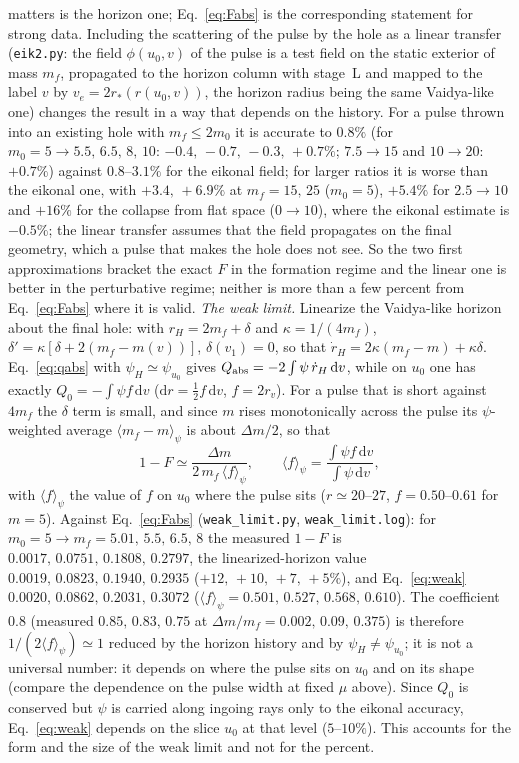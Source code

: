 \documentclass[11pt]{article}
\begin{document}
matters is the horizon one; Eq.~\eqref{eq:Fabs} is the corresponding statement for strong data. Including the scattering of the pulse by the hole as a linear transfer (\texttt{eik2.py}: the field $\phi(u_0,v)$ of the pulse is a test field on the static exterior of mass $m_f$, propagated to the horizon column with stage~L and mapped to the label $v$ by $v_e=2r_*(r(u_0,v))$, the horizon radius being the same Vaidya-like one) changes the result in a way that depends on the history. For a pulse thrown into an existing hole with $m_f\le2m_0$ it is accurate to $0.8\%$ (for $m_0=5\to5.5,\,6.5,\,8,\,10$: $-0.4,\,-0.7,\,-0.3,\,+0.7\%$; $7.5\to15$ and $10\to20$: $+0.7\%$) against $0.8$--$3.1\%$ for the eikonal field; for larger ratios it is worse than the eikonal one, with $+3.4,\,+6.9\%$ at $m_f=15,\,25$ ($m_0=5$), $+5.4\%$ for $2.5\to10$ and $+16\%$ for the collapse from flat space ($0\to10$), where the eikonal estimate is $-0.5\%$; the linear transfer assumes that the field propagates on the final geometry, which a pulse that makes the hole does not see. So the two first approximations bracket the exact $F$ in the formation regime and the linear one is better in the perturbative regime; neither is more than a few percent from Eq.~\eqref{eq:Fabs} where it is valid. \emph{The weak limit.} Linearize the Vaidya-like horizon about the final hole: with $r_H=2m_f+\delta$ and $\kappa=1/(4m_f)$, $\delta'=\kappa[\delta+2(m_f-m(v))]$, $\delta(v_1)=0$, so that $\dot r_H=2\kappa(m_f-m)+\kappa\delta$. Eq.~\eqref{eq:qabs} with $\psi_H\simeq\psi_{u_0}$ gives $Q_{\rm abs}=-2\int\psi\,\dot r_H\,\mathrm dv$, while on $u_0$ one has exactly $Q_0=-\int\psi f\,\mathrm dv$ ($\mathrm dr=\tfrac12f\,\mathrm dv$, $f=2r_v$). For a pulse that is short against $4m_f$ the $\delta$ term is small, and since $m$ rises monotonically across the pulse its $\psi$-weighted average $\langle m_f-m\rangle_\psi$ is about $\Delta m/2$, so that
\begin{equation}
1-F\simeq\frac{\Delta m}{2\,m_f\,\langle f\rangle_\psi},\qquad \langle f\rangle_\psi=\frac{\int\psi f\,\mathrm dv}{\int\psi\,\mathrm dv},
\label{eq:weak}
\end{equation}
with $\langle f\rangle_\psi$ the value of $f$ on $u_0$ where the pulse sits ($r\simeq20$--$27$, $f=0.50$--$0.61$ for $m=5$). Against Eq.~\eqref{eq:Fabs} (\texttt{weak\_limit.py}, \texttt{weak\_limit.log}): for $m_0=5\to m_f=5.01,\,5.5,\,6.5,\,8$ the measured $1-F$ is $0.0017,\,0.0751,\,0.1808,\,0.2797$, the linearized-horizon value $0.0019,\,0.0823,\,0.1940,\,0.2935$ ($+12,\,+10,\,+7,\,+5\%$), and Eq.~\eqref{eq:weak} $0.0020,\,0.0862,\,0.2031,\,0.3072$ ($\langle f\rangle_\psi=0.501,\,0.527,\,0.568,\,0.610$). The coefficient $0.8$ (measured $0.85,\,0.83,\,0.75$ at $\Delta m/m_f=0.002,\,0.09,\,0.375$) is therefore $1/(2\langle f\rangle_\psi)\simeq1$ reduced by the horizon history and by $\psi_H\ne\psi_{u_0}$; it is not a universal number: it depends on where the pulse sits on $u_0$ and on its shape (compare the dependence on the pulse width at fixed $\mu$ above). Since $Q_0$ is conserved but $\psi$ is carried along ingoing rays only to the eikonal accuracy, Eq.~\eqref{eq:weak} depends on the slice $u_0$ at that level ($5$--$10\%$). This accounts for the form and the size of the weak limit and not for the percent.
\end{document}
